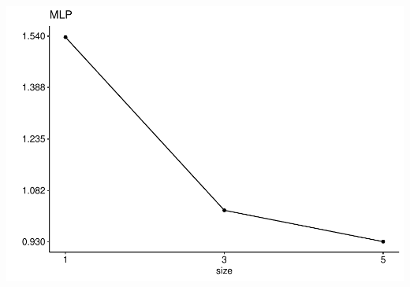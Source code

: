 \documentclass[
]{article}
\begin{document}
\includegraphics{sl-inf-cairs-2301_files/figure-latex/optResults-4.pdf}
\end{document}

